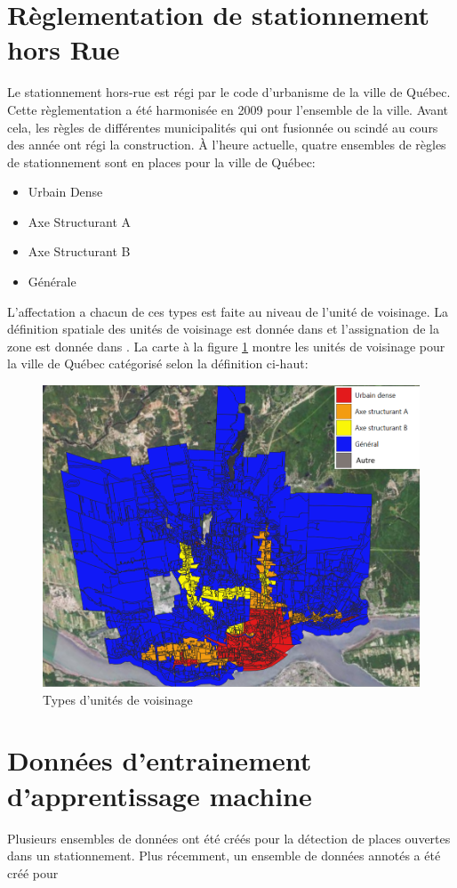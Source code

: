   \section{Règlementation de stationnement hors Rue}
  Le stationnement hors-rue est régi par le code d'urbanisme de la ville de Québec. Cette règlementation a été harmonisée en 2009 pour l'ensemble de la ville. Avant cela, les règles de différentes municipalités qui ont fusionnée ou scindé au cours des année ont régi la construction. À l'heure actuelle, quatre ensembles de règles de stationnement sont en places pour la ville de Québec:
  \begin{itemize}
    \item Urbain Dense 
    \item Axe Structurant A
    \item Axe Structurant B
    \item Générale
  \end{itemize}
  L'affectation a chacun de ces types est faite au niveau de l'unité de voisinage. La définition spatiale des unités de voisinage est donnée dans \textcite{VilledeQuebec:ZonageMunicipal:2024} et l'assignation de la zone est donnée dans \textcite{VilledeQuebec:GrilleSpecifications:2024}. La carte à la figure \ref{fig:types_unites_voisinage} montre les unités de voisinage pour la ville de Québec catégorisé selon la définition ci-haut:
  \begin{figure}
    \centering
    \includegraphics[width=0.5\linewidth]{images/Types_unites_voisinage.png}
    \caption{Types d'unités de voisinage}
    \label{fig:types_unites_voisinage}
  \end{figure}
  \FloatBarrier
  \section{Données d'entrainement d'apprentissage machine}
Plusieurs ensembles de données ont été créés pour la détection de places ouvertes dans un stationnement. Plus récemment, un ensemble de données annotés a été créé pour 
